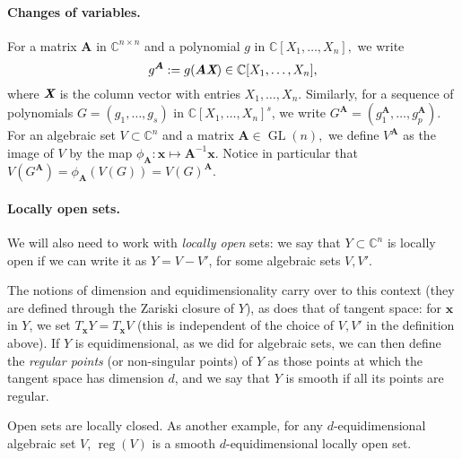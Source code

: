 \documentclass[12pt]{article}
\def\A{\mathfrak{A}}
\def\Xb{\textit{\textbf{X}}}
\def\mA{{\bm A}}
\def\xb{{\bm x}}
\DeclareMathOperator{\GL}{GL}
\DeclareMathOperator{\reg}{reg}
\def\C{\mathbb{C}}
\begin{document}
\paragraph*{Changes of variables.}
For a matrix $\mA$ in $\C^{n\times n}$ and a polynomial $g$ in
$\C[X_1,\hdots,X_n],$ we write \[g^\mA:=g(\mA \Xb) \in
\C[X_1,\dots,X_n],\] where $\Xb$ is the column vector with entries
$X_1,\dots,X_n$. Similarly, for a sequence of polynomials
$G=(g_1,\hdots,g_s)$ in $\C[X_1,\hdots,X_n]^s$, we write $G^{\mA} =
\left(g_1^{\mA},\hdots,g_p^{\mA}\right).$ For an algebraic set $V
\subset \C^n$ and a matrix $\mA \in \GL(n),$ we define $V^{\mA}$ as
the image of $V$ by the map $\phi_{\mA} : \xb \mapsto \mA^{-1}\xb.$
 Notice in particular that
$V(G^{\mA}) = \phi_{\mA}(V(G)) = V(G)^{\mA}. $

\paragraph*{Locally open sets.}
We will also need to work with {\em locally open} sets: we say that $Y
\subset \C^n$ is locally open if we can write it as $Y=V-V'$, for some
algebraic sets $V,V'$. 

The notions of dimension and equidimensionality carry over to this
context (they are defined through the Zariski closure of $Y$), as does
that of tangent space: for $\xb$ in $Y$, we set $T_\xb Y = T_\xb V$
(this is independent of the choice of $V,V'$ in the definition above).
If $Y$ is equidimensional, as we did for algebraic sets, we can then
define the {\em regular points} (or non-singular points) of $Y$ as
those points at which the tangent space has dimension $d$, and we say
that $Y$ is smooth if all its points are regular.

Open sets are locally closed. As another example, for any
$d$-equidimensional algebraic set $V$, $\reg(V)$ is a smooth
$d$-equidimensional locally open set.

\end{document}
